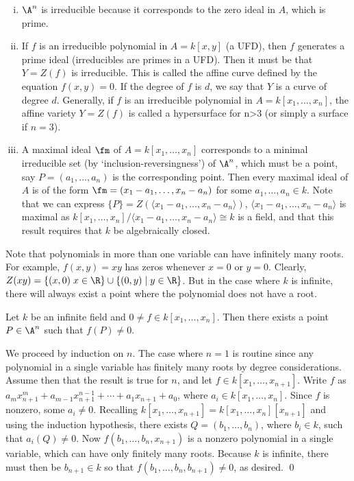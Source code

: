 \begin{ex} \hfill
\begin{enumerate}[(i)]
\item $\A^n$ is irreducible because it corresponds to the zero ideal in $A$, which is prime.
\item If $f$ is an irreducible polynomial in $A= k[x,y]$ (a UFD), then $f$ generates a prime ideal (irreducibles are primes in a UFD). Then it must be that $Y= Z(f)$ is irreducible. This is called the affine curve defined by the equation $f(x,y)=0$. If the degree of $f$ is $d$, we say that $Y$ is a curve of degree $d$. Generally, if $f$ is an irreducible polynomial in $A= k[x_1,\ldots,x_n]$, the affine variety $Y= Z(f)$ is called a hypersurface for n>3 (or simply a surface if $n=3$). 
\item A maximal ideal $\fm$ of $A= k[x_1,\ldots,x_n]$ corresponds to a minimal irreducible set (by `inclusion-reversingness') of $\A^n$, which must be a point, say $P= (a_1,\ldots,a_n)$ is the corresponding point. Then every maximal ideal of $A$ is of the form $\fm= (x_1-a_1,\ldots,x_n-a_n)$ for some $a_1,\ldots,a_n \in k$. Note that we can express $\{P\}= Z(\langle x_1-a_1,\ldots,x_n-a_n \rangle )$, $\langle x_1-a_1,\ldots,x_n-a_n \rangle$ is maximal as $k[x_1,\ldots,x_n]/\langle x_1-a_1,\ldots,x_n-a_n \rangle \cong k$ is a field, and that this result requires that $k$ be algebraically closed. \xqed
\end{enumerate} 
\end{ex}


Note that polynomials in more than one variable can have infinitely many roots. For example, $f(x,y)= xy$ has zeros whenever $x=0$ or $y=0$. Clearly, $Z(xy)= \{ (x,0) \; x \in \R \} \cup \{ (0,y) \;|\; y \in \R \}$. But in the case where $k$ is infinite, there will always exist a point where the polynomial does not have a root. 


\begin{prop}
Let $k$ be an infinite field and $0 \neq f \in k[x_1,\ldots,x_n]$. Then there exists a point $P \in \A^n$ such that $f(P) \neq 0$. 
\end{prop}

\pf We proceed by induction on $n$. The case where $n=1$ is routine since any polynomial in a single variable has finitely many roots by degree considerations. Assume then that the result is true for $n$, and let $f \in k[x_1,\ldots,x_{n+1}]$. Write $f$ as $a_m x_{n+1}^m + a_{m-1} x_{n+1}^{n-1} + \cdots + a_1 x_{n+1} + a_0$, where $a_i \in k[x_1,\ldots,x_n]$. Since $f$ is nonzero, some $a_i \neq 0$. Recalling $k[x_1,\ldots,x_{n+1}]= k[x_1,\ldots,x_n][x_{n+1}]$ and using the induction hypothesis, there exists $Q=(b_1,\ldots,b_n)$, where $b_i \in k$, such that $a_i(Q) \neq 0$. Now $f(b_1,\ldots,b_n,x_{n+1})$ is a nonzero polynomial in a single variable, which can have only finitely many roots. Because $k$ is infinite, there must then be $b_{n+1} \in k$ so that $f(b_1,\ldots,b_n,b_{n+1}) \neq 0$, as desired. \qed \\


